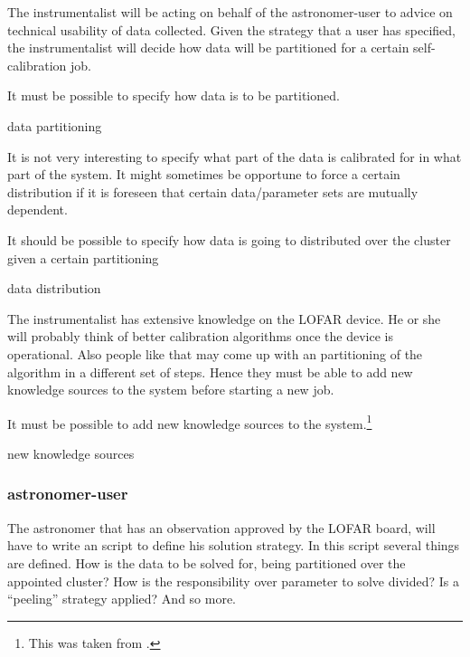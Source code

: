 \documentclass[]{lofar}
\begin{document}
        The instrumentalist will be acting on behalf of the
        astronomer-user to advice on technical usability of data
        collected. Given the strategy that a user has specified, the
        instrumentalist will decide how data will be partitioned for a
        certain self-calibration job.

        \begin{requirement}
          It must be possible to specify how data is to be partitioned.
          \caption{data partitioning\label{req:data-partitioning}}
        \end{requirement}

        It is not very interesting to specify what part of the data is
        calibrated for in what part of the system. It might sometimes
        be opportune to force a certain distribution if it is foreseen
        that certain data/parameter sets are mutually dependent.

        \begin{requirement}
          It should be possible to specify how data is going to
          distributed over the cluster given a certain partitioning
          \caption{data distribution\label{req:data-distribution}}
        \end{requirement}

        The instrumentalist has extensive knowledge on the LOFAR
        device. He or she will probably think of better calibration
        algorithms once the device is operational. Also people like
        that may come up with an partitioning of the algorithm in a
        different set of steps. Hence they must be able to add new
        knowledge sources to the system before starting a new job.

        \begin{requirement}
          It must be possible to add new knowledge sources to the
          system.\protect\footnote{This was taken from \protect\cite{HOO03}.}
          \caption{new knowledge sources\label{req:knowledge-sources}}
        \end{requirement}

      \subsubsection{astronomer-user}

        The astronomer that has an observation approved by the LOFAR
        board, will have to write an script to define his solution
        strategy. In this script several things are defined. How is the data to be
        solved for, being partitioned over the appointed cluster? How
        is the responsibility over parameter to solve divided? Is a
        ``peeling'' strategy applied? And so more.
\end{document}

